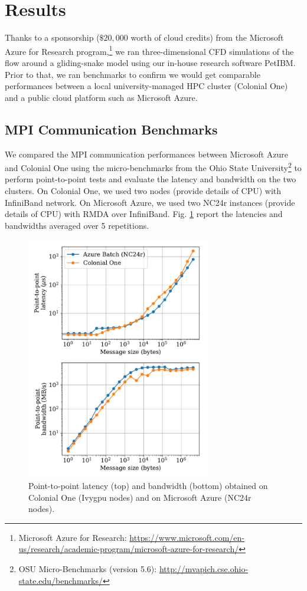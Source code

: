 \documentclass[10pt,journal,compsoc]{IEEEtran}
\begin{document}
\section{Results}\label{sec:results}

Thanks to a sponsorship ($\$20,000$ worth of cloud credits) from the Microsoft Azure for Research program,\footnote{Microsoft Azure for Research: \url{https://www.microsoft.com/en-us/research/academic-program/microsoft-azure-for-research/}} we ran three-dimensional CFD simulations of the flow around a gliding-snake model using our in-house research software PetIBM\cite{chuang_et_al_2018}.
Prior to that, we ran benchmarks to confirm we would get comparable performances between a local university-managed HPC cluster (Colonial One) and a public cloud platform such as Microsoft Azure.

\subsection{MPI Communication Benchmarks}\label{subsec:mpi_benchmarks}

We compared the MPI communication performances between Microsoft Azure and Colonial One using the micro-benchmarks from the Ohio State University\footnote{OSU Micro-Benchmarks (version 5.6): \url{http://mvapich.cse.ohio-state.edu/benchmarks/}} to perform point-to-point tests and evaluate the latency and bandwidth on the two clusters.
On Colonial One, we used two nodes (provide details of CPU) with InfiniBand network.
On Microsoft Azure, we used two NC24r instances (provide details of CPU) with RMDA over InfiniBand.
Fig. \ref{fig:osu_benchmarks} report the latencies and bandwidths averaged over 5 repetitions.

\begin{figure}[!h]
    \centering
    \includegraphics[width=8cm]{figures/osu_latency_bandwidth.pdf}
    \caption{Point-to-point latency (top) and bandwidth (bottom) obtained on Colonial One (Ivygpu nodes) and on Microsoft Azure (NC24r nodes).}
    \label{fig:osu_benchmarks}
\end{figure}
\end{document}
